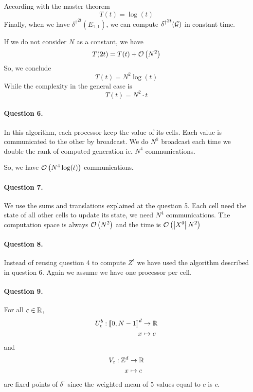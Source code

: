 According with the master theorem
$$
    T(t)=\log(t)
$$
Finally, when we have ${\delta^\dagger}^{2t}(E_{1,1})$, we can compute ${\delta^\dagger}^{2t}(\mathcal{G})$ in constant time.

If we do not consider $N$ as a constant, we have
$$
    T(2t) = T(t) + \mathcal O \left( N^2 \right)
$$
So, we conclude
$$
    T(t)=N^2\log(t)
$$
While the complexity in the general case is
$$
    T(t)=N^2\cdot t
$$

\paragraph{Question 6.}

In this algorithm, each processor keep the value of its cells. Each value is communicated to the other by broadcast. We do $N^2$ broadcast each time we double the rank of computed generation ie. $N^4$ communications.

So, we have $\mathcal O \left( N^4\log(t) \right)$ communications.

\paragraph{Question 7.}

We use the sums and translations explained at the question 5. Each cell need the state of all other cells to update its state, we need $N^4$ communications. The computation space is always $\mathcal O \left( N^2 \right)$ and the time is $\mathcal O \left( \left \lvert X^0\right \rvert N^2 \right)$

\paragraph{Question 8.}

Instead of reusing question 4 to compute $Z^t$ we have used the algorithm described in question 6. Again we assume we have one processor per cell.

\paragraph{Question 9.}

For all $c\in\mathbb{R}$,
$$
    \begin{aligned}
        U^b_c : \left\llbracket 0,N-1 \right\rrbracket^d &\to \mathbb{R}\\
        x &\mapsto c
    \end{aligned}
$$
and
$$
    \begin{aligned}
        V_c : \mathbb{Z}^d &\to \mathbb{R}\\
        x &\mapsto c
    \end{aligned}
$$
are fixed points of $\delta^\dagger$ since the weighted mean of 5 values equal to $c$ is $c$.

